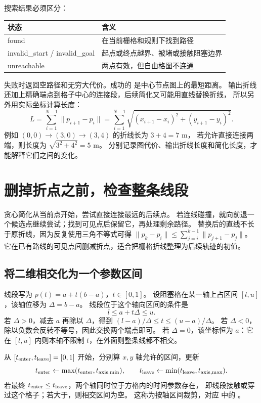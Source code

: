 搜索结果必须区分：
\begin{center}\small
\begin{tabular}{ll}\toprule
状态 & 含义 \\\midrule
found & 在当前栅格和规则下找到路径 \\
invalid\_start / invalid\_goal & 起点或终点越界、被堵或接触阻塞边界 \\
unreachable & 两点有效，但自由格图不连通 \\\bottomrule
\end{tabular}
\end{center}
失败时返回空路径和无穷大代价。成功的  是中心节点图上的最短距离。
输出折线还加上精确端点到格子中心的连接段，后续简化又可能用直线替换折线，
所以另外用实际坐标计算长度：
\begin{equation}
L=\sum_{i=1}^{N-1}\|p_{i+1}-p_i\|
=\sum_{i=1}^{N-1}\sqrt{(x_{i+1}-x_i)^2+(y_{i+1}-y_i)^2}.
\end{equation}
例如 $(0,0)\to(3,0)\to(3,4)$ 的折线长为 $3+4=7$ m，
若允许直接连接两端，则长度为 $\sqrt{3^2+4^2}=5$ m。
分别记录图代价、输出折线长度和简化长度，才能解释它们之间的变化。

\section{删掉折点之前，检查整条线段}
贪心简化从当前点开始，尝试直接连接最远的后续点。
若连线碰撞，就向前退一个候选点继续尝试；找到可见点后保留它，再处理剩余路径。
替换后的直线不长于原折线，因为反复使用三角不等式可得
$\|p_k-p_i\|\leq\sum_{j=i}^{k-1}\|p_{j+1}-p_j\|$。
它在已有路线的可见点间删减折点，适合把栅格折线整理为后续轨迹的初值。

\subsection{将二维相交化为一个参数区间}
线段写为 $p(t)=a+t(b-a)$，$t\in[0,1]$。
设阻塞格在某一轴上占区间 $[l,u]$，该轴位移为 $\Delta=b-a$。
线段位于这个轴向区间的条件是
\begin{equation}l\leq a+t\Delta\leq u.\end{equation}
若 $\Delta>0$，减去 $a$ 再除以 $\Delta$，得到
$(l-a)/\Delta\leq t\leq(u-a)/\Delta$。
若 $\Delta<0$，除以负数会反转不等号，因此交换两个端点即可。
若 $\Delta=0$，该坐标恒为 $a$：它在 $[l,u]$ 内则本轴不限制 $t$，在外面则整条线都不相交。

从 $[t_{\rm enter},t_{\rm leave}]=[0,1]$ 开始，分别算 $x,y$ 轴允许的区间，更新
\begin{equation}
t_{\rm enter}\leftarrow\max(t_{\rm enter},t_{\rm axis,min}),\qquad
 t_{\rm leave}\leftarrow\min(t_{\rm leave},t_{\rm axis,max}).
\end{equation}
若最终 $t_{\rm enter}\leq t_{\rm leave}$，两个轴同时位于方格内的时间参数存在，
即线段接触或穿过这个格子；若大于，则相交区间为空。
这称为按轴区间裁剪，对应  中的 。

